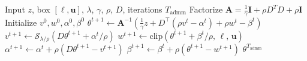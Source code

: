 \begin{algorithm}[h!]
\caption{ADMM for Constrained Proximal Subproblem}
\label{alg:admm}
\begin{algorithmic}[1]
\Require Input $z$, box $[\boldsymbol{\ell}, \mathbf{u}]$, $\lambda$, $\gamma$, $\rho$, $D$, iterations $T_{\mathrm{admm}}$
\State Factorize $\mathbf{A} = \frac{1}{\gamma}\mathbf{I} + \rho D^{T} D + \rho\mathbf{I}$ 
\State Initialize $v^0, w^0, {\alpha}^0, {\beta}^0$
    \State $\theta^{t+1} \leftarrow \mathbf{A}^{-1} \left(\frac{1}{\gamma}z + D^\top(\rho v^t - {\alpha}^t) + \rho w^t - {\beta}^t\right)$
    \State $v^{t+1} \leftarrow \mathcal{S}_{\lambda/\rho}(D\theta^{t+1} + {\alpha}^t/\rho)$
    \State $w^{t+1} \leftarrow \mathrm{clip}(\theta^{t+1} + {\beta}^t/\rho,\, \boldsymbol{\ell},\, \mathbf{u})$
    \State ${\alpha}^{t+1} \leftarrow {\alpha}^t + \rho(D\theta^{t+1} - v^{t+1})$
    \State ${\beta}^{t+1} \leftarrow {\beta}^t + \rho(\theta^{t+1} - w^{t+1})$
\EndFor
\State \Return $\theta^{T_{\mathrm{admm}}}$
\end{algorithmic}
\end{algorithm}
